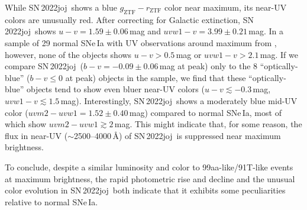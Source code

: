 \documentclass[twocolumn]{aastex631}
\newcommand{\sn}{SN\,2022joj}
\begin{document}
\begin{CJK*}{UTF8}{gbsn}
While \sn\ shows a blue $g_\mathrm{ZTF}-r_\mathrm{ZTF}$ color near maximum, its near-UV colors are unusually red. After correcting for Galactic extinction, \sn\ shows $u-v=1.59\pm0.06$\,mag and $uvw1 - v=3.99\pm0.21$\,mag. In a sample of 29 normal SNe\,Ia with UV observations around maximum from \citet{Brown_2018}, however, none of the objects shows $u-v>0.5$\,mag or $uvw1 - v>2.1$\,mag. If we compare \sn\ ($b-v=-0.09\pm0.06$\,mag at peak) only to the 8 ``optically-blue'' ($b-v\le0$ at peak) objects in the sample, we find that these ``optically-blue'' objects tend to show even bluer near-UV colors ($u-v\lesssim-0.3$\,mag, $uvw1-v\lesssim1.5$\,mag). Interestingly, \sn\ shows a moderately blue mid-UV color ($uvm2-uvw1=1.52\pm0.40$\,mag) compared to normal SNe\,Ia, most of which show $uvm2-uvw1\gtrsim2$\,mag. This might indicate that, for some reason, the flux in near-UV ($\sim$2500--4000\,\r{A}) of \sn\ is suppressed near maximum brightness.

To conclude, despite a similar luminosity and color to 99aa-like/91T-like events at maximum brightness, the rapid photometric rise and decline and the unusual color evolution in \sn\ both indicate that it exhibits some peculiarities relative to normal SNe\,Ia.




\end{CJK*}
\end{document}
